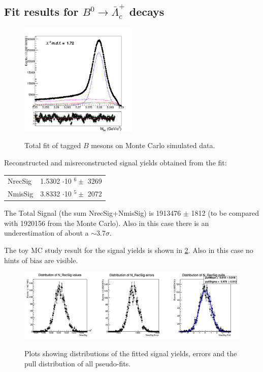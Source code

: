     

\subsection{Fit results for $B^0 \rightarrow \bar{\Lambda}_c^+$ decays} 



\begin{figure}[H]
    \centering
    {\includegraphics[width=0.50\textwidth]{05-BtagFit/figs/stream1_neutralBtag_Total_fit_sigmaCB_misReco_slope_free_370bins.png}}
    \caption{Total fit of tagged $B$ mesons on Monte Carlo simulated data.}
    \label{fig:neutralAntiLambdaC_BtagFit}
    \end{figure}
    \vspace{1.5cm} 

Reconstructed and misreconstructed signal yields obtained from the fit:\\
    \vspace{0.25 cm}
    
    \begin{tabular}{ |p{2.5cm}||p{4.2cm}|  }
     \hline
     NrecSig  & 1.5302 $\cdot$10 $^6 \pm$ 3269\\
     NmisSig &  3.8332 $\cdot$10 $^5 \pm$ 2072 \\
     \hline
    \end{tabular}      
 
   
 \vspace{0.5 cm}
 \noindent The Total Signal (the sum  NrecSig+NmisSig) is 1913476 $\pm$ 1812 (to be compared with 1920156 from the Monte Carlo).
 Also in this case there is an underestimation of about a $\sim 3.7\sigma$. 
 
        
The toy MC study result for the signal yields is shown in \cref{fig:NrecSig_neutralAntiBtag_mcstudy}.
 Also in this case no hints of bias are visible.

\begin{figure}[H]
    \centering
    {\centering\includegraphics[width=14cm]{05-BtagFit/figs/NrecSigneutralAntiBtag_mcstudy.png}}
    \caption{Plots showing distributions of the fitted signal yields, errors and the pull distribution of
    all pseudo-fits. }
    \label{fig:NrecSig_neutralAntiBtag_mcstudy}
    \end{figure}
